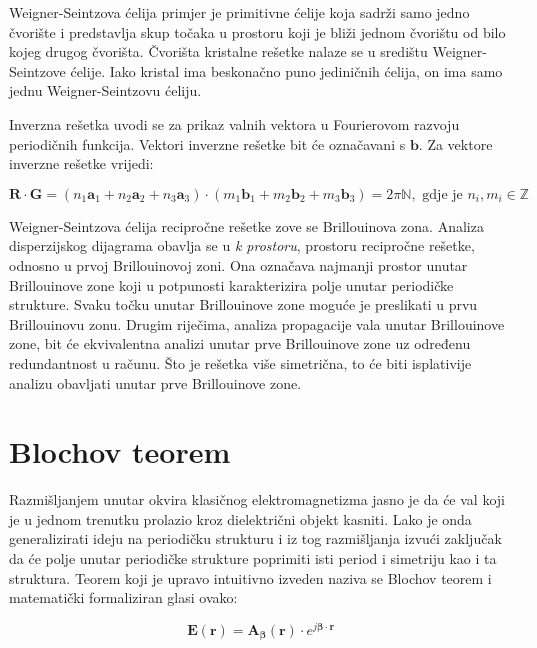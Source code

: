\documentclass[utf8, seminar, numeric]{fer}
\begin{document}
Weigner-Seintzova ćelija primjer je primitivne ćelije koja sadrži samo jedno
čvorište i predstavlja skup točaka u prostoru koji je bliži jednom čvorištu
od bilo kojeg drugog čvorišta. Čvorišta kristalne rešetke nalaze se u središtu
Weigner-Seintzove ćelije. Iako kristal ima beskonačno puno jediničnih ćelija,
on ima samo jednu Weigner-Seintzovu ćeliju.

Inverzna rešetka uvodi se za prikaz valnih vektora u Fourierovom razvoju
periodičnih funkcija. Vektori inverzne rešetke bit će označavani s $\mathbf{b}$.
Za vektore inverzne rešetke vrijedi:

\begin{equation}
	\mathbf{R} \cdot \mathbf{G} =
	(n_1\mathbf{a}_1 + n_2\mathbf{a}_2 + n_3\mathbf{a}_3)
	\cdot
	(m_1\mathbf{b}_1 + m_2\mathbf{b}_2 + m_3\mathbf{b}_3) = 2 \pi \mathbb{N},
		\text{ gdje je }n_i, m_i \in \mathbb{Z}
\end{equation}


Weigner-Seintzova ćelija recipročne rešetke zove se Brillouinova zona. Analiza
disperzijskog dijagrama obavlja se u \textit{k prostoru}, prostoru recipročne
rešetke, odnosno u prvoj Brillouinovoj zoni. Ona označava najmanji
prostor unutar Brillouinove zone koji u potpunosti karakterizira polje unutar
periodičke strukture. Svaku točku unutar Brillouinove zone moguće je preslikati
u prvu Brillouinovu zonu. Drugim riječima, analiza propagacije vala unutar
Brillouinove zone, bit će ekvivalentna analizi unutar prve Brillouinove zone uz
određenu redundantnost u računu. Što je rešetka više simetrična, to će biti
isplativije analizu obavljati unutar prve Brillouinove zone.


\section{Blochov teorem}

Razmišljanjem unutar okvira klasičnog elektromagnetizma jasno je da će val koji
je u jednom trenutku prolazio kroz dielektrični objekt kasniti. Lako je onda
generalizirati ideju na periodičku strukturu i iz tog razmišljanja izvući
zaključak da će polje unutar periodičke strukture poprimiti isti period i
simetriju kao i ta struktura. Teorem koji je upravo intuitivno izveden naziva
se Blochov teorem i matematički formaliziran glasi ovako:

\begin{equation} \label{eq:bloch}
	\mathbf{E}(\mathbf{r}) =
	\mathbf{A}_{\bm{\beta}}(\mathbf{r}) \cdot
		e^{j {\bm{\beta}} \cdot \mathbf{r}}
\end{equation}
\end{document}
